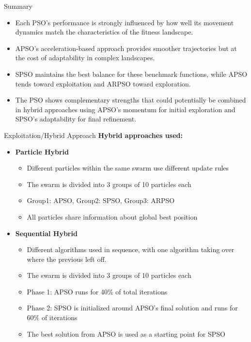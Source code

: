 \documentclass[aspectratio=169]{beamer}
\begin{document}
\begin{frame}{Summary}
    \begin{itemize}
        \item Each PSO's performance is strongly influenced by how well its movement dynamics match the characteristics of the fitness landscape.
        \item APSO's acceleration-based approach provides smoother trajectories but at the cost of adaptability in complex landscapes.
        \item SPSO maintains the best balance for these benchmark functions, while APSO tends toward exploitation and ARPSO toward exploration.
        \item The PSO shows complementary strengths that could potentially be combined in hybrid approaches using APSO's momentum for initial exploration and SPSO's adaptability for final refinement.
    \end{itemize}
\end{frame}

\begin{frame}{Exploitation/Hybrid Approach}
    \textbf{Hybrid approaches used:}
    \begin{itemize}
        \item \textbf{Particle Hybrid}
        \begin{itemize}
            \item Different particles within the same swarm use different update rules
            \item The swarm is divided into 3 groups of 10 particles each
            \item Group1: APSO, Group2: SPSO, Group3: ARPSO
            \item All particles share information about global best position
        \end{itemize}
        
        \item \textbf{Sequential Hybrid}
        \begin{itemize}
            \item Different algorithms used in sequence, with one algorithm taking over where the previous left off.
            \item The swarm is divided into 3 groups of 10 particles each
            \item Phase 1: APSO runs for 40\% of total iterations
            \item Phase 2: SPSO is initialized around APSO's final solution and runs for 60\% of iterations
            \item The best solution from APSO is used as a starting point for SPSO
        \end{itemize}
    \end{itemize}
\end{frame}
\end{document}

